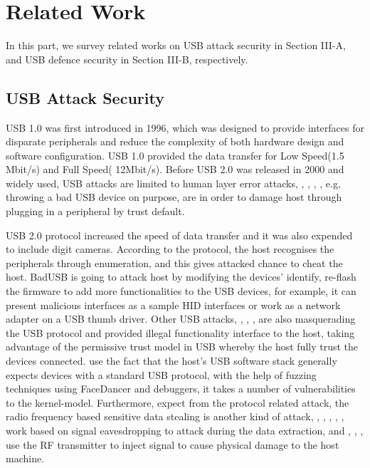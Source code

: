 \section{Related Work}
\label{section:related_work}
In this part, we survey related works on USB attack security in Section III-A, and USB defence security in Section III-B, respectively.
\subsection{USB Attack Security}
USB 1.0\cite{usb01} was first introduced in 1996, which was designed to provide interfaces for disparate peripherals and reduce the complexity of both hardware design and software configuration\cite{sok}. USB 1.0 provided the data transfer for Low Speed(1.5 Mbit/s) and Full Speed( 12Mbit/s). Before USB 2.0 was released in 2000 and widely used, USB attacks are limited to human layer error attacks, \cite{se}, \cite{goverment}, \cite{atkvec}, \cite{ueerreallydo}, e.g, throwing a bad USB device on purpose, are in order to damage host through plugging in a peripheral by trust default. 

USB 2.0 protocol increased the speed of data transfer and it was also expended to include digit cameras. According to the protocol, the host recognises the peripherals through enumeration, and this gives attacked chance to cheat the host. BadUSB\cite{badusb} is going to attack host by modifying the devices' identify, re-flash the firmware to add more functionalities to the USB devices, for example, it can present malicious interfaces as a sample HID interfaces or work as a network adapter on a USB thumb driver. Other USB attacks, \cite{rubber}, \cite{usbdriver}, \cite{usbbypassing}, \cite{iseeyou} are also masquerading the USB protocol and provided illegal functionality interface to the host, taking advantage of the permissive trust model in USB whereby the host fully trust the devices connected. \cite{syzkaller} use the fact that the host's USB software stack generally expects devices with a standard USB protocol, with the help of fuzzing techniques using FaceDancer \cite{facedancer} and debuggers, it takes a number of vulnerabilities to the kernel-model. Furthermore, expect from the protocol related attack, the radio frequency based sensitive data stealing is another kind of attack, \cite{smartphone} , \cite{poweremi}, \cite{badusbhub}, \cite{usbfinger}, \cite{side}, \cite{usbdriver} work based on signal eavesdropping to attack during the data extraction, and \cite{usbkiller}, \cite{cable}, \cite{usbee}, \cite{turnip} use the RF transmitter to inject signal to cause physical damage to the host machine.    

